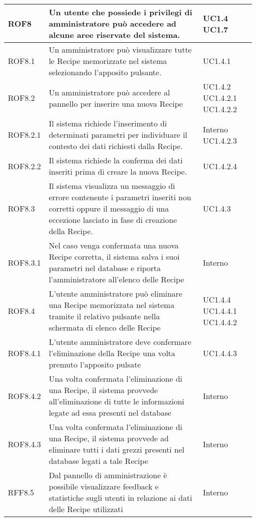 \begin{center}
\begin{longtable}{| p{2.5cm} | p{8cm} | p{2cm} |}
		ROF8  &  Un utente che possiede i privilegi di amministratore può accedere ad alcune aree riservate del sistema.  &  UC1.4 \newline UC1.7 \\
		\hline
		ROF8.1  &  Un amministratore può visualizzare tutte le Recipe memorizzate nel sistema selezionando l'apposito pulsante.  &  UC1.4.1 \\
		\hline
		ROF8.2  &  Un amministratore può accedere al pannello per inserire una nuova Recipe  &  UC1.4.2 \newline UC1.4.2.1 \newline UC1.4.2.2  \\
		\hline
		ROF8.2.1  &  Il sistema richiede l'inserimento di determinati parametri per individuare il contesto dei dati richiesti dalla Recipe.  &  Interno \newline UC1.4.2.3 \\
		\hline
		ROF8.2.2  &  Il sistema richiede la conferma dei dati inseriti prima di creare la nuova Recipe.  &  UC1.4.2.4 \\
		\hline
		ROF8.3  &  Il sistema visualizza un messaggio di errore contenente i parametri inseriti non corretti oppure il messaggio di una eccezione lasciato in fase di creazione della Recipe.  &  UC1.4.3 \\
		\hline
		ROF8.3.1  &  Nel caso venga confermata  una nuova Recipe corretta, il sistema salva i suoi parametri nel database  e riporta l'amministratore all'elenco delle Recipe  &  Interno \\
		\hline
		ROF8.4  &  L'utente amministratore può eliminare una Recipe memorizzata nel sistema tramite il relativo pulsante nella schermata di elenco delle Recipe  &  UC1.4.4 \newline UC1.4.4.1 \newline UC1.4.4.2 \\
		\hline
		ROF8.4.1  &  L'utente amministratore deve confermare l'eliminazione della Recipe una volta premuto l'apposito pulsate  &  UC1.4.4.3 \\
		\hline
		ROF8.4.2  &  Una volta confermata l'eliminazione di una Recipe, il sistema provvede all'eliminazione di tutte le informazioni legate ad essa presenti nel database  &  Interno \\
		\hline
		ROF8.4.3  &  Una volta confermata l'eliminazione di una Recipe, il sistema provvede ad eliminare tutti i dati grezzi presenti nel database legati a tale Recipe  &  Interno \\
		\hline
		RFF8.5  &  Dal pannello di amministrazione è possibile visualizzare feedback e statistiche sugli utenti in relazione ai dati delle Recipe utilizzati  &  Interno \\
		\hline



\end{longtable}
\end{center}
